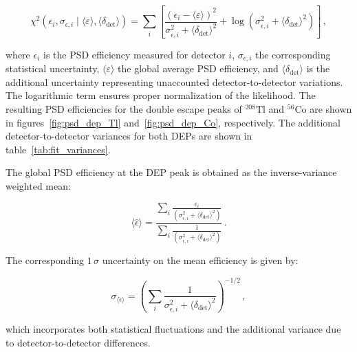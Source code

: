 \begin{equation}
\label{eq:chi2_eff_fit}
\chi^2 \left( \epsilon_i, \sigma_{\epsilon, i} \mid \langle \varepsilon \rangle, \langle \delta_{\mathrm{det}} \rangle \right) = 
\sum_i \left[ \frac{(\epsilon_i - \langle \varepsilon \rangle)^2}{\sigma_{\epsilon,i}^2 + \langle \delta_{\mathrm{det}} \rangle^2} + \log\left( \sigma_{\epsilon,i}^2 + \langle \delta_{\mathrm{det}} \rangle^2 \right) \right] \,,
\end{equation}

\noindent where $\epsilon_i$ is the PSD efficiency measured for detector $i$, $\sigma_{\epsilon, i}$ the corresponding statistical uncertainty, $\langle \varepsilon \rangle$ the global average PSD efficiency, and $\langle \delta_{\mathrm{det}} \rangle$ is the additional uncertainty representing unaccounted detector-to-detector variations. 
The logarithmic term ensures proper normalization of the likelihood. 
The resulting PSD efficiencies for the double escape peaks of $^{208}$Tl and $^{56}$Co are shown in figures~\ref{fig:psd_dep_Tl} and~\ref{fig:psd_dep_Co}, respectively. The additional detector-to-detector variances for both DEPs are shown in table~\ref{tab:fit_variances}.

The global PSD efficiency at the DEP peak is obtained as the inverse-variance weighted mean:

\begin{equation}
\label{eq:chi2_eff_fit_mean}
    \langle \hat{\epsilon} \rangle = \frac{ \sum_i \frac{\epsilon_i}{\left( \sigma_{\epsilon, i}^2 + \langle \delta_{\mathrm{det}} \rangle^2 \right)}}{\sum_i \frac{1}{\left( \sigma_{\epsilon, i}^2 + \langle \delta_{\mathrm{det}} \rangle^2 \right)}} \,.
\end{equation}

\noindent The corresponding $1\,\sigma$ uncertainty on the mean efficiency is given by:


\begin{equation}
\label{eq:chi2_eff_fit_std}
    \sigma_{ \langle \hat{\epsilon} \rangle} = \left( \sum_i \frac{1}{\sigma_{\epsilon, i}^2 + \langle \delta_{\mathrm{det}} \rangle^2} \right)^{-1/2} \,,
\end{equation}

\noindent which incorporates both statistical fluctuations and the additional variance due to detector-to-detector differences. 


